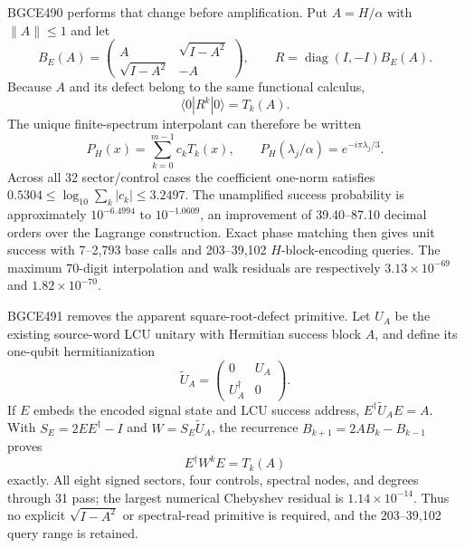 \documentclass[11pt]{article}
\theoremstyle{definition}
\theoremstyle{remark}
\begin{document}
BGCE490 performs that change before amplification. Put $A=H/\alpha$ with $\lVert A\rVert\le1$ and let
\begin{equation}
 B_E(A)=
 \begin{pmatrix}
  A & \sqrt{I-A^2}\\
  \sqrt{I-A^2} & -A
 \end{pmatrix},\qquad
 R=\operatorname{diag}(I,-I)B_E(A).
\end{equation}
Because $A$ and its defect belong to the same functional calculus,
\begin{equation}
 \langle0|R^k|0\rangle=T_k(A).
 \label{eq:chebwalk091}
\end{equation}
The unique finite-spectrum interpolant can therefore be written
\begin{equation}
 P_H(x)=\sum_{k=0}^{m-1}c_kT_k(x),\qquad
 P_H(\lambda_j/\alpha)=e^{-i\pi\lambda_j/3}.
\end{equation}
Across all 32 sector/control cases the coefficient one-norm satisfies
$0.5304\le\log_{10}\sum_k|c_k|\le3.2497$. The unamplified success probability is approximately $10^{-6.4994}$ to $10^{-1.0609}$, an improvement of 39.40--87.10 decimal orders over the Lagrange construction. Exact phase matching then gives unit success with 7--2,793 base calls and 203--39,102 $H$-block-encoding queries. The maximum 70-digit interpolation and walk residuals are respectively $3.13\times10^{-69}$ and $1.82\times10^{-70}$.

BGCE491 removes the apparent square-root-defect primitive. Let $U_A$ be the existing source-word LCU unitary with Hermitian success block $A$, and define its one-qubit hermitianization
\begin{equation}
 \widetilde U_A=
 \begin{pmatrix}
 0&U_A\\ U_A^\dagger&0
 \end{pmatrix}.
\end{equation}
If $E$ embeds the encoded signal state and LCU success address, $E^\dagger\widetilde U_AE=A$. With $S_E=2EE^\dagger-I$ and $W=S_E\widetilde U_A$, the recurrence $B_{k+1}=2AB_k-B_{k-1}$ proves
\begin{equation}
 E^\dagger W^kE=T_k(A)
 \label{eq:sourcewordcheb091}
\end{equation}
exactly. All eight signed sectors, four controls, spectral nodes, and degrees through 31 pass; the largest numerical Chebyshev residual is $1.14\times10^{-14}$. Thus no explicit $\sqrt{I-A^2}$ or spectral-read primitive is required, and the 203--39,102 query range is retained.
\end{document}
